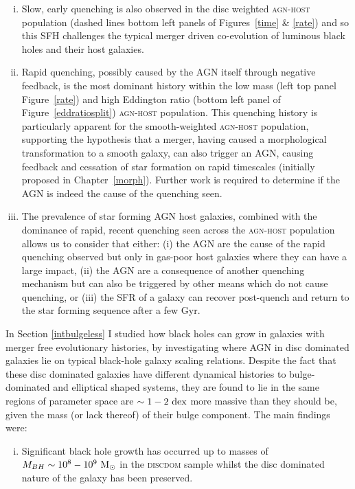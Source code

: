 {\begin{enumerate}[(i)]
\item Slow, early quenching is also observed in the disc weighted \textsc{agn-host} population (dashed lines bottom left panels of Figures~\ref{time} \& \ref{rate}) and so this SFH challenges the typical merger driven co-evolution of luminous black holes and their host galaxies.

\item Rapid quenching, possibly caused by the AGN itself through negative feedback, is the most dominant history within the low mass (left top panel Figure~\ref{rate}) and high Eddington ratio (bottom left panel of Figure~\ref{eddratiosplit}) \textsc{agn-host} population. This quenching history is particularly apparent for the smooth-weighted \textsc{agn-host} population, supporting the hypothesis that a merger, having caused a morphological transformation to a smooth galaxy, can also trigger an AGN, causing feedback and cessation of star formation on rapid timescales (initially proposed in Chapter~\ref{morph}). Further work is required to determine if the AGN is indeed the cause of the quenching seen. 

\item The prevalence of star forming AGN host galaxies, combined with the dominance of rapid, recent quenching seen across the \textsc{agn-host} population allows us to consider that either: (i)  the AGN are the cause of the rapid quenching observed but only in gas-poor host galaxies where they can have a large impact, (ii) the AGN are a consequence of another quenching mechanism but can also be triggered by other means which do not cause quenching, or (iii) the SFR of a galaxy can recover post-quench and return to the star forming sequence after a few Gyr.

\end{enumerate}

In Section \ref{intbulgeless} I studied how black holes can grow in galaxies with merger free evolutionary histories, by investigating where AGN in disc dominated galaxies lie on typical black-hole galaxy scaling relations. Despite the fact that these disc dominated galaxies have different dynamical histories to bulge-dominated and elliptical shaped systems, they are found to lie in the same regions of parameter space are $\sim1-2~\rm{dex}$ more massive than they should be, given the mass (or lack thereof) of their bulge component. The main findings were:
\begin{enumerate}[(i)]
\item Significant black hole growth has occurred up to masses of $M_{BH}\sim10^8 - 10^9~\rm{M}_{\odot}$ in the \textsc{discdom} sample whilst the disc dominated nature of the galaxy has been preserved.


\end{enumerate}}
